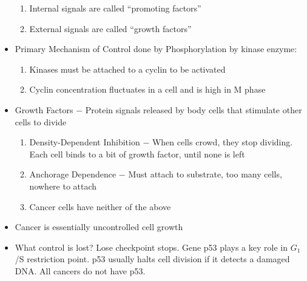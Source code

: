 \documentclass[12pt]{article}
\begin{document}
\begin{itemize}
    \begin{enumerate}

      \item Internal signals are called ``promoting factors''

      \item External signals are called ``growth factors''

    \end{enumerate}

  \item Primary Mechanism of Control done by Phosphorylation by kinase enzyme:

    \begin{enumerate}

      \item Kinases must be attached to a cyclin to be activated

      \item Cyclin concentration fluctuates in a cell and is high in M phase

    \end{enumerate}

  \item Growth Factors $-$ Protein signals released by body cells that stimulate other cells to divide

    \begin{enumerate}

      \item Density-Dependent Inhibition $-$ When cells crowd, they stop dividing. Each cell binds to a bit of growth factor, until none is left

      \item Anchorage Dependence $-$ Must attach to substrate, too many cells, nowhere to attach

      \item Cancer cells have neither of the above

    \end{enumerate}

  \item Cancer is essentially uncontrolled cell growth

  \item What control is lost? Lose checkpoint stops. Gene p53 plays a key role in $G_1$/S restriction point. p53 usually halts cell division if it detects a damaged DNA. All cancers do not have p53.

\end{itemize}
\end{document}

